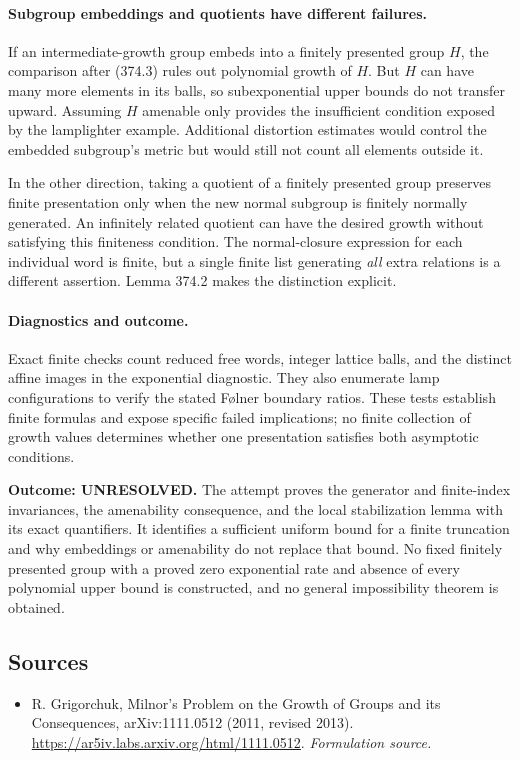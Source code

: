 \documentclass[11pt]{article}
\begin{document}
\paragraph{Subgroup embeddings and quotients have different failures.}
If an intermediate-growth group embeds into a finitely presented group
$H$, the comparison after (374.3) rules out polynomial growth of $H$.
But $H$ can have many more elements in its balls, so subexponential
upper bounds do not transfer upward. Assuming $H$ amenable only
provides the insufficient condition exposed by the lamplighter example.
Additional distortion estimates would control the embedded subgroup's
metric but would still not count all elements outside it.

In the other direction, taking a quotient of a finitely presented group
preserves finite presentation only when the new normal subgroup is
finitely normally generated. An infinitely related quotient can have
the desired growth without satisfying this finiteness condition. The
normal-closure expression for each individual word is finite, but a
single finite list generating \emph{all} extra relations is a different
assertion. Lemma 374.2 makes the distinction explicit.

\paragraph{Diagnostics and outcome.}
Exact finite checks count reduced free words, integer lattice balls,
and the distinct affine images in the exponential diagnostic. They
also enumerate lamp configurations to verify the stated Følner boundary
ratios. These tests establish finite formulas and expose specific failed
implications; no finite collection of growth values determines whether
one presentation satisfies both asymptotic conditions.

\textbf{Outcome: UNRESOLVED.} The attempt proves the generator and
finite-index invariances, the amenability consequence, and the local
stabilization lemma with its exact quantifiers. It identifies a sufficient
uniform bound for a finite truncation and why embeddings or amenability
do not replace that bound. No fixed finitely presented group with a
proved zero exponential rate and absence of every polynomial upper
bound is constructed, and no general impossibility theorem is obtained.

\subsection{Sources}
\begin{itemize}
\item[S1]R. Grigorchuk, Milnor's Problem on the Growth of Groups and its Consequences, arXiv:1111.0512 (2011, revised 2013).
\url{https://ar5iv.labs.arxiv.org/html/1111.0512}.
\textit{Formulation source.}
\end{itemize}
\end{document}
